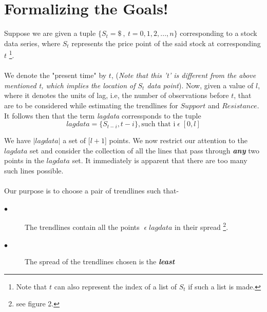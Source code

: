 \documentclass[letterpaper, 12pt] {article}
\begin{document}
	
	\section{Formalizing the Goals!}
	Suppose we are given a tuple $\{S_t = \$\ ,\ t = 0, 1,2, ..., n\}$ corresponding to a stock data series, where $S_t$ represents the price point of the said stock at corresponding $t$ \footnote{Note that $t$ can also represent the index of a list of $S_t$ if such a list is made.}. 
	\paragraph{}
	We denote the "present time" by $t$, (\textit{Note that this 't' is different from the above mentioned t, which implies the location of $S_t$ data point}). Now, given a value of $l$, where it denotes the units of lag, i.e, the number of observations before $t$, that are to be considered while estimating the trendlines for $Support$ and $Resistance$. It follows then that the term \textit{lagdata} corressponds to the tuple
	\begin{equation*}
	lagdata = \{S_{t-i}, t-i\}, \text{such that i} \; \epsilon \;[0, l]
	\end{equation*} 
	
	We have $|lagdata|$ a set of [$l+1$] points. We now restrict our attention to the $lagdata$ set and consider the collection of all the lines that pass through \textbf{\textit{any}} two points in the $lagdata$ set. It immediately is apparent that there are too many such lines possible. 
	\paragraph{}
	Our purpose is to choose a pair of trendlines such that-
	
	\begin{description}
		\item[$\bullet$] The trendlines contain all the points $\; \epsilon\; lagdata $ in their spread
		\footnote{see figure 2.}.
		\item[$\bullet$] The spread of the trendlines chosen is the \textbf{\textit{least}}
	\end{description}
	
\end{document}
